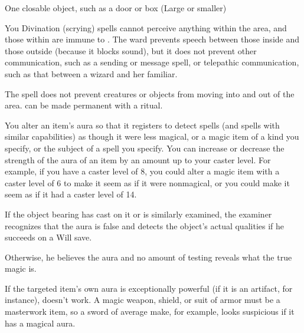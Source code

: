 \begin{spelltarget}{One closable object, such as a door or box (Large or smaller)}
\begin{spelltarget}{You}
Divination (scrying) spells cannot perceive anything within the area, and those within are immune to . The ward prevents speech between those inside and those outside (because it blocks sound), but it does not prevent other communication, such as a sending or message spell, or telepathic communication, such as that between a wizard and her familiar.
\par The spell does not prevent creatures or objects from moving into and out of the area.
\spellnotes {} can be made permanent with a  ritual.

\spelleffect You alter an item's aura so that it registers  to  detect spells (and spells with similar  capabilities) as though it were less magical, or a magic item of a kind you specify, or the subject of a spell you specify. You can increase or decrease the strength of the aura of an item by an amount up to your caster level. For example, if you have a caster level of 8, you could alter a magic item with a caster level of 6 to make it seem as if it were nonmagical, or you could make it seem as if it had a caster level of 14.
\par If the object bearing   has  cast on it or is similarly examined, the examiner recognizes that the aura is false and detects the object's actual qualities if he succeeds on a Will save.
\par Otherwise, he believes the aura and no  amount of testing reveals what the true  magic is.
\par If the targeted item's own aura is exceptionally powerful (if it is an artifact, for  instance),  doesn't work.
 A magic weapon, shield, or suit of  armor must be a masterwork item, so a  sword of average make, for example, looks  suspicious if it has a magical aura.


\end{spelltarget}
\end{spelltarget}
